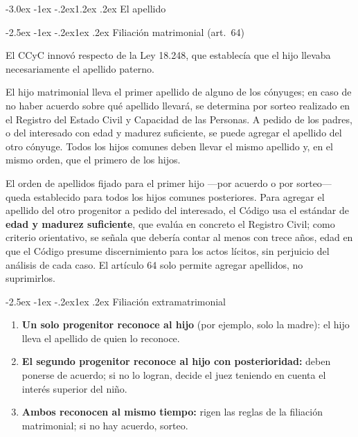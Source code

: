 \documentclass[12pt,oneside]{book}
\makeatletter
\renewcommand\section{\@startsection{section}{1}{\z@}%
  {-3.0ex \@plus -1ex \@minus -.2ex}{1.2ex \@plus .2ex}%
  {\normalfont\large\bfseries\color{acento}}}
\renewcommand\subsection{\@startsection{subsection}{2}{\z@}%
  {-2.5ex \@plus -1ex \@minus -.2ex}{1ex \@plus .2ex}%
  {\normalfont\normalsize\bfseries}}
\makeatother
\begin{document}
\section{El apellido}

\subsection{Filiación matrimonial (art.~64)}

El CCyC innovó respecto de la Ley 18.248, que establecía que el hijo llevaba necesariamente el apellido paterno.

\begin{regla}
El hijo matrimonial lleva el primer apellido de alguno de los cónyuges; en caso de no haber acuerdo sobre qué apellido llevará, se determina por sorteo realizado en el Registro del Estado Civil y Capacidad de las Personas. A pedido de los padres, o del interesado con edad y madurez suficiente, se puede agregar el apellido del otro cónyuge. Todos los hijos comunes deben llevar el mismo apellido y, en el mismo orden, que el primero de los hijos.
\end{regla}

El orden de apellidos fijado para el primer hijo ---por acuerdo o por sorteo--- queda establecido para todos los hijos comunes posteriores. Para agregar el apellido del otro progenitor a pedido del interesado, el Código usa el estándar de \textbf{edad y madurez suficiente}, que evalúa en concreto el Registro Civil; como criterio orientativo, se señala que debería contar al menos con trece años, edad en que el Código presume discernimiento para los actos lícitos, sin perjuicio del análisis de cada caso. El artículo 64 solo permite agregar apellidos, no suprimirlos.

\subsection{Filiación extramatrimonial}

\begin{enumerate}
\item \textbf{Un solo progenitor reconoce al hijo} (por ejemplo, solo la madre): el hijo lleva el apellido de quien lo reconoce.
\item \textbf{El segundo progenitor reconoce al hijo con posterioridad:} deben ponerse de acuerdo; si no lo logran, decide el juez teniendo en cuenta el interés superior del niño.
\item \textbf{Ambos reconocen al mismo tiempo:} rigen las reglas de la filiación matrimonial; si no hay acuerdo, sorteo.
\end{enumerate}
\end{document}
